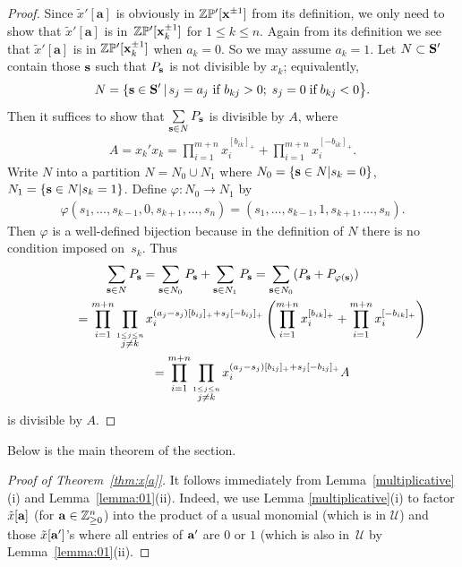 \documentclass[pdftex]{sigma}
\numberwithin{equation}{section}
\begin{document}
\begin{proof}
Since $\tilde{x}'[\mathbf{a}]$ is obviously in $\mathbb{ZP'}[{\bf x}^{\pm1}]$ from its def\/inition, we only need to show that $\tilde{x}'[\mathbf{a}]$ is in~$\mathbb{ZP'}[{\bf x}_k^{\pm1}]$ for $1\le k\le n$. Again from its def\/inition we see that $\tilde{x}'[\mathbf{a}]$ is in $\mathbb{ZP'}[{\bf x}_k^{\pm1}]$ when $a_k=0$. So we may assume $a_k=1$. Let $N\subset{\bf S}'$ contain those ${\bf s}$ such that $P_{\bf s}$ is not divisible by $x_k$; equivalently,
\begin{gather*}
N=\{{\bf s}\in {\bf S}' \,| \,s_j=a_j\textrm{ if }b_{kj}>0; \; s_j=0 \; \textrm{if} \; b_{kj}<0 \big\}.
\end{gather*}
Then it suf\/f\/ices to show that $\sum\limits_{{\bf s}\in N}P_{\bf s}$ is divisible by $A$, where
\begin{gather*}
A=x_k'x_k=\prod_{i=1}^{m+n}x_i^{[b_{ik}]_+}+\prod_{i=1}^{m+n}x_i^{[-b_{ik}]_+}.
\end{gather*}
Write $N$ into a partition $N=N_0\cup N_1$ where $N_0=\{{\bf s}\in N | s_k=0\}$, $N_1=\{{\bf s}\in N | s_k=1\}$.
Def\/ine $\varphi\colon N_0\to N_1$ by
\begin{gather*}
\varphi(s_1,\dots,s_{k-1},0,s_{k+1},\dots,s_n)=(s_1,\dots,s_{k-1},1,s_{k+1},\dots,s_n).
\end{gather*}
Then $\varphi$ is a well-def\/ined bijection because in the def\/inition of $N$ there is no condition imposed on~$s_k$.
Thus
\begin{gather*}
\sum_{{\bf s}\in N}P_{\bf s} =\sum_{{\bf s}\in N_0}P_{\bf s}+\sum_{{\bf s}\in N_1}P_{\bf s}=
\sum_{{\bf s}\in N_0}(P_{\bf s}+P_{\varphi({\bf s})})\\
\hphantom{\sum_{{\bf s}\in N}P_{\bf s}}{}
=\prod_{i=1}^{m+n}\prod_{\stackrel{1\le j\le n}{j\neq k}}
x_i^{(a_j-s_j)[b_{ij}]_+ + s_j[-b_{ij}]_+}
\left(\prod_{i=1}^{m+n}
x_i^{[b_{ik}]_+}+\prod_{i=1}^{m+n}
x_i^{[-b_{ik}]_+}\right)\\
\hphantom{\sum_{{\bf s}\in N}P_{\bf s}}{}
 =\prod_{i=1}^{m+n}\prod_{\stackrel{1\le j\le n}{j\neq k}}
x_i^{(a_j-s_j)[b_{ij}]_+ + s_j[-b_{ij}]_+}
A
\end{gather*}
is divisible by $A$.
\end{proof}

Below is the main theorem of the section.

\begin{proof}[Proof of Theorem~\ref{thm:x[a]}]
It follows immediately from Lemma~\ref{multiplicative}(i) and Lemma~\ref{lemma:01}(ii).
Indeed, we use Lemma \ref{multiplicative}(i) to factor $\tilde{x}[{\bf a}]$ (for ${\bf a}\in\mathbb{Z}_{\ge0}^n$) into the product of a usual monomial (which is in $\mathcal{U}$) and those $\tilde{x}[{\bf a}']$'s where all entries of ${\bf a}'$ are $0$ or $1$ (which is also in~$\mathcal{U}$ by  Lemma~\ref{lemma:01}(ii).
\end{proof}
\end{document}

